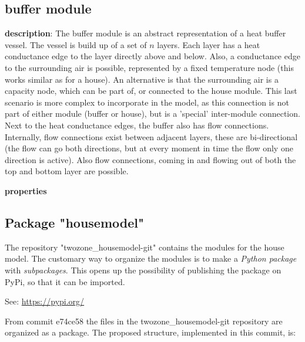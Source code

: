 \subsection{buffer module}
\textbf{description}: The buffer module is an abstract representation of a heat buffer vessel. The vessel is build up of a set of $n$ layers. Each layer has a heat conductance edge to the layer directly above and below. Also, a conductance edge to the surrounding air is possible, represented by a fixed temperature node (this works similar as for a house). An alternative is that the surrounding air is a capacity node, which can be part of, or connected to the house module. This last scenario is more complex to incorporate in the model, as this connection is not part of either module (buffer or house), but is a 'special' inter-module connection. Next to the heat conductance edges, the buffer also has flow connections. Internally, flow connections exist between adjacent layers, these are bi-directional (the flow can go both directions, but at every moment in time the flow only one direction is active). Also flow connections, coming in and flowing out of both the top and bottom layer are possible. 

\textbf{properties}



\subsection{Package "housemodel"}

The repository "\textsf{twozone\_housemodel-git}" contains the modules for the house model. The customary way to organize the modules is to make a \emph{Python package} with \emph{subpackages}. This opens up the possibility of publishing the package on PyPi, so that it can be imported.

See: \url{https://pypi.org/}

From commit \textsf{e74ce58} the files in the \textsf{twozone\_housemodel-git} repository are organized as a package. The proposed structure, implemented in this commit, is:


